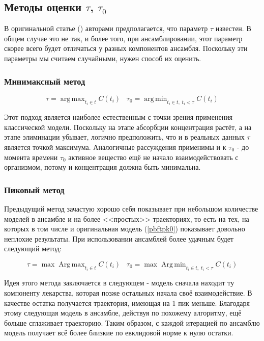 \documentclass[oneside,senior,etd]{BYUPhys}
\DeclareMathOperator*{\argmax}{arg\,max}
\DeclareMathOperator*{\argmin}{arg\,min}
\DeclareMathOperator*{\Argmax}{Arg\,max}
\DeclareMathOperator*{\Argmin}{Arg\,min}
\begin{document}
\subsection{Методы оценки $\tau$, $\tau_0$}

В оригинальной статье (\cite{pbftpk}) авторами предполагается, что параметр $\tau$ известен. В общем случае это не так, и более того, при ансамблировании, этот параметр скорее всего будет отличаться у разных компонентов ансамбля. Поскольку эти параметры мы считаем случайными, нужен способ их оценить.

\subsubsection{Минимаксный метод}

\[
	\tau = \argmax_{t_i \in t} C(t_i) \; \; \; \tau_0 = \argmin_{t_i \in t, \; t_i < \tau} C(t_i)
\]

Этот подход является наиболее естественным с точки зрения применения классической модели. Поскольку на этапе абсорбции концентрация растёт, а на этапе элиминации убывает, логично предположить, что и в реальных данных $\tau$ является точкой максимума. Аналогичные рассуждения применимы и к $\tau_0$ - до момента времени $\tau_0$ активное вещество ещё не начало взаимодействовать с организмом, потому и концентрация должна быть минимальна.


\subsubsection{Пиковый метод}

Предыдущий метод зачастую хорошо себя показывает при небольшом количестве моделей в ансамбле и на более <<простых>> траекториях, то есть на тех, на которых в том числе и оригинальная модель (\ref{pbftpk0}) показывает довольно неплохие результаты. При использовании ансамблей более удачным будет следующий метод:

\[
	\tau = \max \Argmax_{t_i \in t} C(t_i) \; \; \; \tau_0 = \max \Argmin_{t_i \in t, \; t_i < \tau} C(t_i)
\]

Идея этого метода заключается в следующем - модель сначала находит ту компоненту лекарства, которая позже остальных начала своё взаимодействие. В качестве остатка получается траектория, имеющая на 1 пик меньше. Благодаря этому следующая модель в ансамбле, действуя по похожему алгоритму, ещё больше сглаживает траекторию. Таким образом, с каждой итерацией по ансамблю модель получает всё более близкие по евклидовой норме к нулю остатки.
\end{document}
